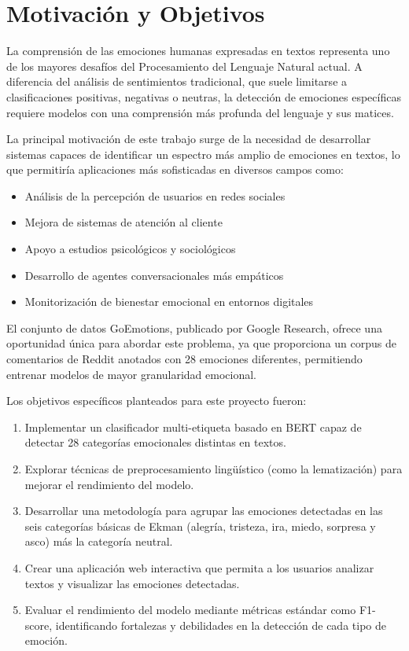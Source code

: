 \documentclass[12pt,a4paper]{report}
\begin{document}
\section{Motivación y Objetivos}

La comprensión de las emociones humanas expresadas en textos representa uno de los mayores desafíos del Procesamiento del Lenguaje Natural actual. A diferencia del análisis de sentimientos tradicional, que suele limitarse a clasificaciones positivas, negativas o neutras, la detección de emociones específicas requiere modelos con una comprensión más profunda del lenguaje y sus matices.

La principal motivación de este trabajo surge de la necesidad de desarrollar sistemas capaces de identificar un espectro más amplio de emociones en textos, lo que permitiría aplicaciones más sofisticadas en diversos campos como:

\begin{itemize}
  \item Análisis de la percepción de usuarios en redes sociales
  \item Mejora de sistemas de atención al cliente
  \item Apoyo a estudios psicológicos y sociológicos
  \item Desarrollo de agentes conversacionales más empáticos
  \item Monitorización de bienestar emocional en entornos digitales
\end{itemize}

El conjunto de datos GoEmotions, publicado por Google Research, ofrece una oportunidad única para abordar este problema, ya que proporciona un corpus de comentarios de Reddit anotados con 28 emociones diferentes, permitiendo entrenar modelos de mayor granularidad emocional.

Los objetivos específicos planteados para este proyecto fueron:

\begin{enumerate}
  \item Implementar un clasificador multi-etiqueta basado en BERT capaz de detectar 28 categorías emocionales distintas en textos.
  \item Explorar técnicas de preprocesamiento lingüístico (como la lematización) para mejorar el rendimiento del modelo.
  \item Desarrollar una metodología para agrupar las emociones detectadas en las seis categorías básicas de Ekman (alegría, tristeza, ira, miedo, sorpresa y asco) más la categoría neutral.
  \item Crear una aplicación web interactiva que permita a los usuarios analizar textos y visualizar las emociones detectadas.
  \item Evaluar el rendimiento del modelo mediante métricas estándar como F1-score, identificando fortalezas y debilidades en la detección de cada tipo de emoción.
\end{enumerate}
\end{document}
